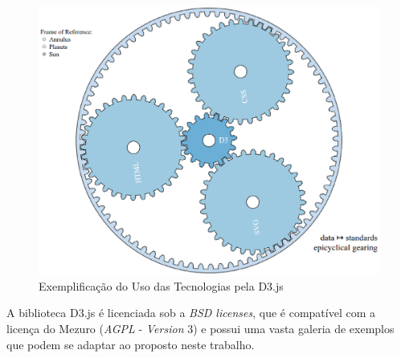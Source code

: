 \begin{figure}[!htb]
	\centering
    \includegraphics[keepaspectratio=true,scale=0.5]
    {figuras/d3_gears.eps}
  \caption{Exemplificação do Uso das Tecnologias pela D3.js \cite{michaeld3}}
  \label{fig:d3_gears}
\end{figure}

A biblioteca D3.js é licenciada sob a \textit{BSD licenses}, que é compatível
com a licença do Mezuro (\textit{AGPL} - \textit{Version} 3) e possui uma vasta
galeria de exemplos que podem se adaptar ao proposto neste trabalho.

